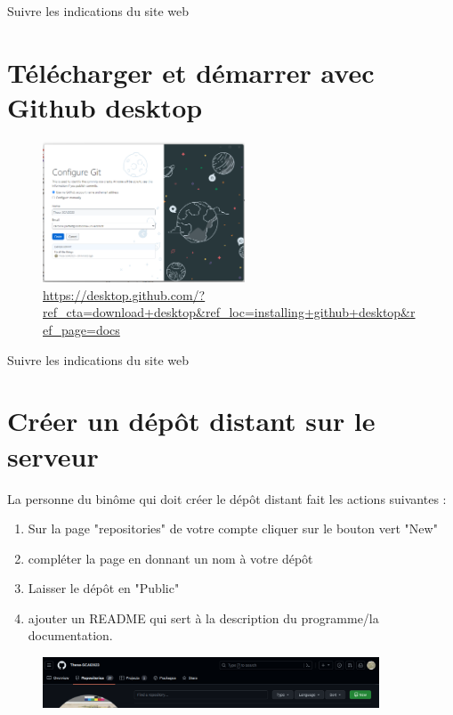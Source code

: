  Suivre les indications du site web


\vspace{0.5cm}
\section{Télécharger et démarrer avec Github desktop}
\vspace{0.5cm}

\begin{figure}[H]
\caption{\url{https://desktop.github.com/?ref_cta=download+desktop&ref_loc=installing+github+desktop&ref_page=docs}}
  \includegraphics[width=6cm]{images/github_desktop_connect.png}
  
  \end{figure}

 Suivre les indications du site web



\section{Créer un dépôt distant sur le serveur}
La personne du binôme qui doit créer le dépôt distant fait les actions suivantes :

\begin{enumerate}
\item Sur la page "repositories" de votre compte cliquer sur le bouton vert "New"
\item compléter la page en donnant un nom à votre dépôt
\item Laisser le dépôt en "Public"
\item ajouter un README qui sert à la description du programme/la documentation.
\end{enumerate}
  

\begin{figure}[H]

  \includegraphics[width=10cm]{images/depot_distant_crea.png}
    \end{figure}

